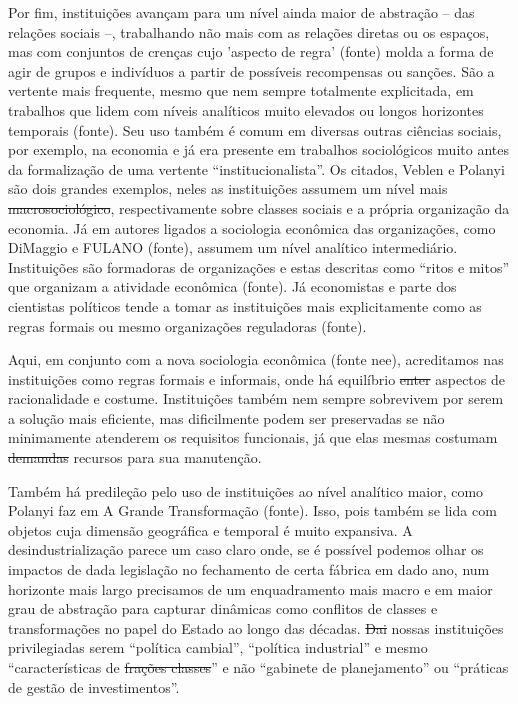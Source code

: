 Por fim, instituições avançam para um nível ainda maior de abstração -- das relações sociais --,
trabalhando não mais com as relações diretas ou os espaços, mas com
conjuntos de crenças cujo 'aspecto de regra' (fonte) molda a forma
de agir de grupos e indivíduos a partir de possíveis recompensas ou sanções. São a vertente mais frequente, mesmo que nem sempre totalmente explicitada, em trabalhos que lidem com 
níveis analíticos muito elevados ou longos horizontes temporais (fonte). Seu uso também é comum em diversas outras ciências sociais,
por exemplo, na economia e já era presente em trabalhos sociológicos
muito antes da formalização de uma vertente ``institucionalista''. Os
citados, Veblen e Polanyi são dois grandes exemplos, neles as instituições assumem um nível mais \sout{macrosociológico}, respectivamente sobre classes sociais e a própria organização da economia. Já em autores ligados a sociologia econômica das organizações, como DiMaggio e FULANO (fonte), assumem um nível analítico intermediário. Instituições são formadoras de organizações e estas descritas como ``ritos e mitos'' que organizam a atividade econômica (fonte). Já economistas e parte dos cientistas políticos
tende a tomar as instituições mais explicitamente como as regras formais ou mesmo organizações reguladoras (fonte).

Aqui, em conjunto com a nova sociologia econômica (fonte nee), acreditamos nas instituições como regras formais e informais, onde há equilíbrio \sout{enter} aspectos de racionalidade e costume. Instituições também nem sempre sobrevivem por serem a solução mais eficiente, mas dificilmente podem ser preservadas se não minimamente atenderem os requisitos funcionais, já que elas mesmas costumam \sout{demandas} recursos
para sua manutenção.

Também há predileção pelo uso de instituições ao nível analítico maior, como Polanyi faz em A Grande Transformação (fonte). Isso, pois também se lida com objetos cuja dimensão
geográfica e temporal é muito expansiva. A desindustrialização parece um caso claro onde, se é possível podemos olhar os impactos de dada legislação no fechamento de certa fábrica em dado ano, num horizonte mais largo precisamos de um enquadramento mais macro e em maior grau de abstração para capturar dinâmicas como conflitos
de classes e transformações no papel do Estado ao longo das décadas. \sout{Dai} nossas instituições privilegiadas serem ``política cambial'', ``política industrial'' e mesmo ``características de \sout{frações classes}'' e não ``gabinete de planejamento'' ou ``práticas de gestão de investimentos''.

